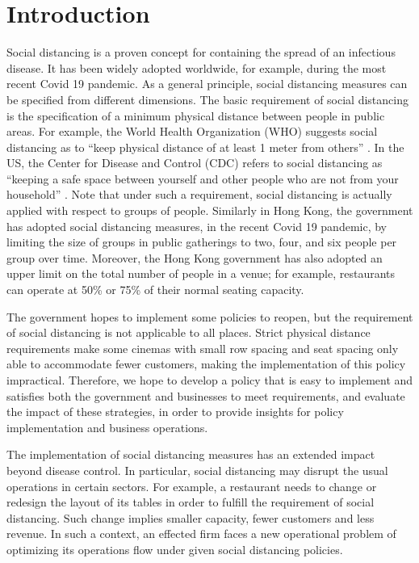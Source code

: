 \section{Introduction}
Social distancing is a proven concept for containing the spread of an infectious disease. It has been widely adopted worldwide, for example, during the most recent Covid 19 pandemic. As a general principle, social distancing measures can be specified from different dimensions. The basic requirement of social distancing is the specification of a minimum physical distance between people in public areas. For example, the World Health Organization (WHO) suggests social distancing as to ``keep physical distance of at least 1 meter from others'' \cite{AdviceforPublic}. In the US, the Center for Disease and Control (CDC) refers to social distancing as ``keeping a safe space between yourself and other people who are not from your household'' \cite{CDC}. 
Note that under such a requirement, social distancing is actually applied with respect to groups of people. Similarly in Hong Kong, the government has adopted social distancing measures, in the recent Covid 19 pandemic, by limiting the size of groups in public gatherings to two, four, and six people per group over time. Moreover, the Hong Kong government has also adopted an upper limit on the total number of people in a venue; for example, restaurants can operate at 50\% or 75\% of their normal seating capacity. 

The government hopes to implement some policies to reopen, but the requirement of social distancing is not applicable to all places. Strict physical distance requirements make some cinemas with small row spacing and seat spacing only able to accommodate fewer customers, making the implementation of this policy impractical. Therefore, we hope to develop a policy that is easy to implement and satisfies both the government and businesses to meet requirements, and evaluate the impact of these strategies, in order to provide insights for policy implementation and business operations.

The implementation of social distancing measures has an extended impact beyond disease control. In particular, social distancing may disrupt the usual operations in certain sectors. For example, a restaurant needs to change or redesign the layout of its tables in order to fulfill the requirement of social distancing. Such change implies smaller capacity, fewer customers and less revenue. In such a context, an effected firm faces a new operational problem of optimizing its operations flow under given social distancing policies.


